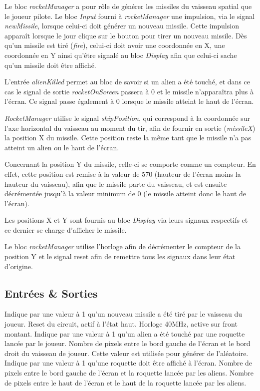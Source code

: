 \documentclass[french]{nakrule}
\begin{document}
Le bloc \emph{rocketManager} a pour rôle de générer les missiles du vaisseau
spatial que le joueur pilote. Le bloc \emph{Input} fourni à \emph{rocketManager}
une impulsion, via le signal \emph{newMissile}, lorsque celui-ci doit générer un
nouveau missile. Cette impulsion apparaît lorsque le jour clique sur le bouton
pour tirer un nouveau missile. Dès qu'un missile est tiré (\emph{fire}), celui-ci doit avoir
une coordonnée en X, une coordonnée en Y ainsi qu'être signalé au bloc
\emph{Display} afin que celui-ci sache qu'un missile doit être affiché.

L'entrée \emph{alienKilled} permet au bloc de savoir si un alien a été touché,
et dans ce cas le signal de sortie \emph{rocketOnScreen} passera à 0 et le
missile n'apparaîtra plus à l'écran. Ce signal passe
également à 0 lorsque le missile atteint le haut de l'écran.

\emph{RocketManager} utilise le signal \emph{shipPosition}, qui correspond à la
coordonnée sur l'axe horizontal du vaisseau au moment du tir, afin de fournir
en sortie (\emph{missileX}) la position X du missile. Cette position reste la
même tant que le missile n'a pas atteint un alien ou le haut de l'écran.

Concernant la position Y du missile, celle-ci se comporte comme un compteur. En
effet, cette position est remise à la valeur de 570 (hauteur de l'écran moins la
hauteur du vaisseau), afin que le missile parte du vaisseau, et est ensuite
décrémentée jusqu'à la valeur minimum de 0 (le missile atteint donc le haut de
l'écran).

Les positions X et Y sont fournis au bloc \emph{Display} via leurs signaux
respectifs et ce dernier se charge d'afficher le missile.

Le bloc \emph{rocketManager} utilise l’horloge afin de décrémenter le compteur de
la position Y et le signal reset afin de remettre tous les signaux dans leur
état d'origine.

\subsection{Entrées \& Sorties}
\label{subsec:Entrees_Sorties_rocketManager}

\begin{descr}
   Indique par une valeur à 1 qu'un nouveau missile a été
  tiré par le vaisseau du joueur.
   Reset du circuit, actif à l'état haut.
   Horloge 40MHz, active sur front montant.
   Indique par une valeur à 1 qu'un alien a été touché
  par une roquette lancée par le joueur.
   Nombre de pixels entre le bord gauche de l'écran et
  le bord droit du vaisseau de joueur. Cette valeur est utilisée pour générer de l'aléatoire.
   Indique par une valeur à 1 qu'une roquette doit être
  affiché à l'écran.
   Nombre de pixels entre le bord gauche de l'écran et la roquette
  lancée par les aliens.
   Nombre de pixels entre le haut de l'écran et le haut de la roquette
  lancée par les aliens.
\end{descr}
\clearpage
\end{document}
